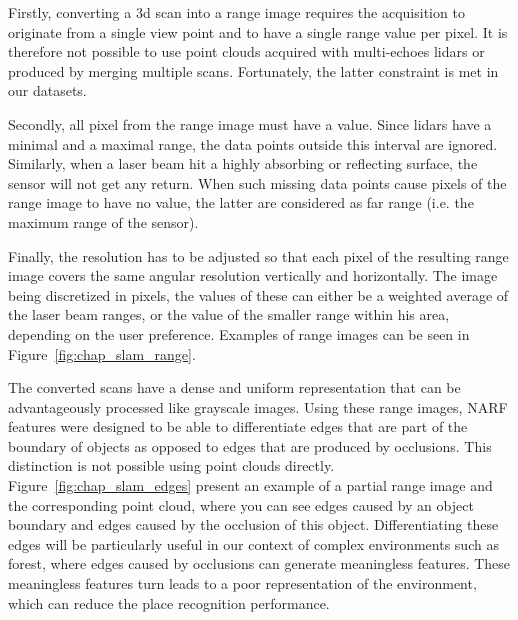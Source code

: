 Firstly, converting a \gls*{3d} scan into a range image requires the acquisition to originate from a single view point and to have a single range value per pixel. It is therefore not possible to use point clouds acquired with multi-echoes \gls*{lidar}s or produced by merging multiple scans. Fortunately, the latter constraint is met in our datasets.

Secondly, all pixel from the range image must have a value. Since \gls*{lidar}s have a minimal and a maximal range, the data points outside this interval are ignored. Similarly, when a laser beam hit a highly absorbing or reflecting surface, the sensor will not get any return. When such missing data points cause pixels of the range image to have no value, the latter are considered as far range (i.e. the maximum range of the sensor). 

Finally, the resolution has to be adjusted so that each pixel of the resulting range image covers the same angular resolution vertically and horizontally. The image being discretized in pixels, the values of these can either be a weighted average of the laser beam ranges, or the value of the smaller range within his area, depending on the user preference. Examples of range images can be seen in Figure~\ref{fig:chap_slam_range}.

The converted scans have a dense and uniform representation that can be advantageously processed like grayscale images. Using these range images, NARF features were designed to be able to differentiate edges that are part of the boundary of objects as opposed to edges that are produced by occlusions. This distinction is not possible using point clouds directly. Figure~\ref{fig:chap_slam_edges} present an example of a partial range image and the corresponding point cloud, where you can see edges caused by an object boundary and edges caused by the occlusion of this object. Differentiating these edges will be particularly useful in our context of complex environments such as forest, where edges caused by occlusions can generate meaningless features. These meaningless features turn leads to a poor representation of the environment, which can reduce the place recognition performance. 

